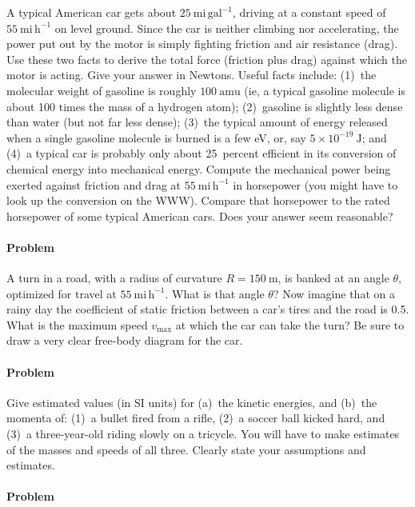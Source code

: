 \documentclass[12pt]{article}
\newcounter{problem}
\begin{document}
A typical American car gets about $25~\mathrm{mi\,gal^{-1}}$, driving
at a constant speed of $55~\mathrm{mi\,h^{-1}}$ on level ground.
Since the car is neither climbing nor accelerating, the power put out
by the motor is simply fighting friction and air resistance (drag).
Use these two facts to derive the total force (friction plus drag)
against which the motor is acting.  Give your answer in Newtons.
Useful facts include: (1)~the molecular weight of gasoline is roughly
$100~\mathrm{amu}$ (ie, a typical gasoline molecule is about 100 times
the mass of a hydrogen atom); (2)~gasoline is slightly less dense than
water (but not far less dense); (3)~the typical amount of energy
released when a single gasoline molecule is burned is a few eV, or,
say $5\times 10^{-19}~\mathrm{J}$; and (4)~a typical car is probably
only about 25~percent efficient in its conversion of chemical energy
into mechanical energy.  Compute the mechanical power being exerted
against friction and drag at $55~\mathrm{mi\,h^{-1}}$ in horsepower
(you might have to look up the conversion on the WWW).  Compare that
horsepower to the rated horsepower of some typical American cars.
Does your answer seem reasonable?

\paragraph{Problem~\theproblem}

A turn in a road, with a radius of curvature $R=150~\mathrm{m}$, is
banked at an angle $\theta$, optimized for travel at
$55~\mathrm{mi\,h^{-1}}$.  What is that angle $\theta$?  Now imagine
that on a rainy day the coefficient of static friction between a car's
tires and the road is 0.5.  What is the maximum speed $v_\mathrm{max}$
at which the car can take the turn?  Be sure to draw a very clear
free-body diagram for the car.

\paragraph{Problem~\theproblem}

Give estimated values (in SI units) for (a)~the kinetic energies, and
(b)~the momenta of: (1)~a bullet fired from a rifle, (2)~a soccer ball
kicked hard, and (3)~a three-year-old riding slowly on a tricycle.
You will have to make estimates of the masses and speeds of all three.
Clearly state your assumptions and estimates.

\paragraph{Problem~\theproblem}
\end{document}
